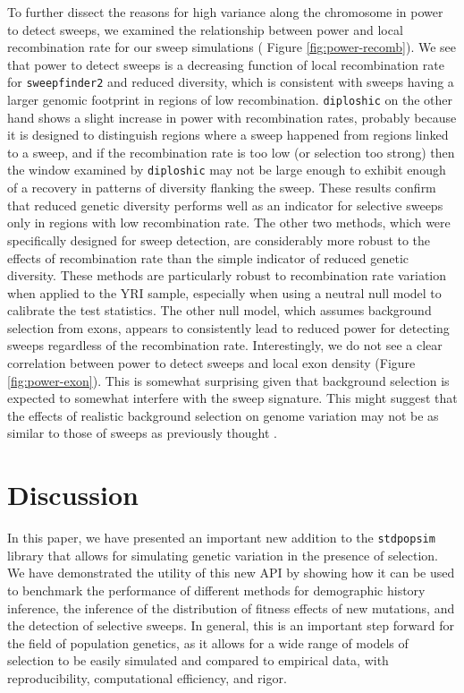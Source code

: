 \documentclass[hidelinks]{article}
\newcommand{\stdpopsim}{\texttt{stdpopsim}\xspace}
\newcommand{\sweepfinder}{\texttt{sweepfinder2}\xspace}
\newcommand{\diploshic}{\texttt{diploshic}\xspace}
\begin{document}
    To further dissect the reasons for high variance along the chromosome in power to detect sweeps,
    we examined the relationship between power and local recombination rate for our sweep simulations ( Figure \ref{fig:power-recomb}).
    We see that power to detect sweeps is
    a decreasing function of local recombination rate for \sweepfinder and reduced diversity,
    which is consistent with sweeps having a larger genomic footprint in regions of low
    recombination.
    \diploshic on the other hand shows a slight increase in power with recombination rates,
    probably because it is designed to distinguish regions where a sweep happened from regions linked to a sweep,
    and if the recombination rate is too low (or selection too strong) then the window examined by \diploshic may
    not be large enough to exhibit enough of a recovery in patterns of diversity flanking the sweep.
    These results confirm that reduced genetic diversity performs well as an indicator for selective sweeps only in regions with
    low recombination rate.
    The other two methods, which were specifically designed for sweep detection, are considerably more robust 
    to the effects of recombination rate than the simple indicator of reduced genetic diversity.
    These methods are particularly robust to recombination rate variation when applied to 
    the YRI sample, especially when using a neutral null model to calibrate the test statistics.
    The other null model, which assumes background selection from exons,
    appears to consistently lead to reduced power for detecting sweeps regardless of the recombination rate.
    Interestingly, we do not see a clear correlation between power to detect sweeps and
    local exon density (Figure \ref{fig:power-exon}).
    This is somewhat surprising given that background selection is expected to somewhat interfere with the sweep signature.
    This might suggest that the effects of realistic background selection on genome variation
    may not be as similar to those of sweeps as previously thought \citep{schrider2020background}.

\section*{Discussion}
    \label{Discussion}
    In this paper, we have presented an important new addition to the \stdpopsim{} library
    that allows for simulating genetic variation in the presence of selection.
    We have demonstrated the utility of this new API by showing how it can be used to benchmark
    the performance of different methods for demographic history inference, the inference of the distribution
    of fitness effects of new mutations, and the detection of selective sweeps.
    In general, this is an important step forward for the field of population genetics,
    as it allows for a wide range of models of selection to be easily simulated and compared to
    empirical data, with reproducibility, computational efficiency, and rigor.
\end{document}
